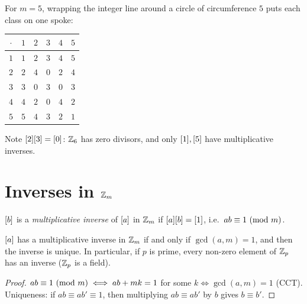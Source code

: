 For $m = 5$, wrapping the integer line around a circle of circumference $5$ puts each class
on one spoke:
\begin{center}
\end{center}

\begin{example}
\begin{center}
\begin{tabular}{c|ccccc}
$\cdot$ & $1$ & $2$ & $3$ & $4$ & $5$\\
\hline
$1$ & $1$ & $2$ & $3$ & $4$ & $5$\\
$2$ & $2$ & $4$ & $0$ & $2$ & $4$\\
$3$ & $3$ & $0$ & $3$ & $0$ & $3$\\
$4$ & $4$ & $2$ & $0$ & $4$ & $2$\\
$5$ & $5$ & $4$ & $3$ & $2$ & $1$\\
\end{tabular}
\end{center}
Note $[2][3] = [0]$: $\mathbb{Z}_{6}$ has zero divisors, and only $[1], [5]$ have
multiplicative inverses.
\end{example}

\section{Inverses in $\mathbb{Z}_{m}$}

\begin{definition}
$[b]$ is a \emph{multiplicative inverse} of $[a]$ in $\mathbb{Z}_{m}$ if $[a][b] = [1]$,
i.e.\ $ab \equiv 1 \ (\mathrm{mod}\ m)$.
\end{definition}

\begin{theorem}
$[a]$ has a multiplicative inverse in $\mathbb{Z}_{m}$ if and only if $\gcd(a,m) = 1$, and then the
inverse is unique. In particular, if $p$ is prime, every non-zero element of $\mathbb{Z}_{p}$ has an
inverse ($\mathbb{Z}_{p}$ is a field).
\end{theorem}
\begin{proof}
$ab \equiv 1 \ (\mathrm{mod}\ m) \iff ab + mk = 1$ for some $k \iff \gcd(a,m) = 1$ (CCT). Uniqueness: if
$ab \equiv ab' \equiv 1$, then multiplying $ab \equiv ab'$ by $b$ gives $b \equiv b'$.
\end{proof}

